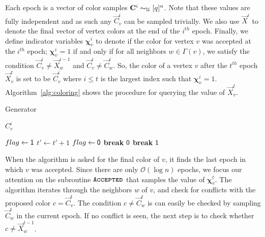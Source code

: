 Each epoch is a vector of color samples $\vec C^{i} \thicksim_{\mathcal U} [q]^n$.
Note that these values are fully independent and as such any $\vec C^i_v$ can be sampled trivially.
We also use $\vec X^i$ to denote the final vector of vertex colors at the end of the $i^{th}$ epoch.
Finally, we define indicator variables $\bm \chi^i_v$ to denote if the color for vertex $v$ was accepted at the $i^{th}$ epoch;
$\bm \chi^i_v = 1$ if and only if for all neighbors $w\in \Gamma(v)$,
we satisfy the condition $\vec  C^i_v\not= \vec X^{i-1}_w$ and $\vec C^i_v\not= \vec C^i_w$.
So, the color of a vertex $v$ after the $t^{th}$ epoch $\vec X^t_v$ is set to be $\vec C^i_v$
where $i\le t$ is the largest index such that $\bm \chi^i_v=1$.
Algorithm~\ref{alg:coloring} shows the procedure for querying the value of $\vec X^t_v$.

\begin{algorithm}[H]
\caption{Generator}
\begin{algorithmic}[1]

            \State \Return $C^i_v$
        \EndIf
    \EndFor
\EndProcedure

                    \State $flag\gets \ONE$
                        \State $t'\gets t' + 1$
                            \State $flag\gets \ZERO$
                            \State \textbf{break}
                        \EndIf
                    \EndWhile
                        \State \Return $\ZERO$
                    \EndIf
                    \State \textbf{break}
               \EndIf
           \EndIf
        \EndFor
    \EndFor
    \State \Return $\ONE$
\EndProcedure

\end{algorithmic}
\label{alg:coloring}
\end{algorithm}

When the algorithm is asked for the final color of $v$, it finds the last epoch in which $v$ was accepted.
Since there are only $\mathcal O(\log n)$ epochs, we focus our attention on the subroutine $\func{Accepted}$ that samples the value of $\bm\chi^t_v$.
The algorithm iterates through the neighbors $w$ of $v$, and check for conflicts with the proposed color $c=\vec C^t_v$.
The condition $c\not= \vec C^t_w$ is can easily be checked by sampling $\vec C^t_w$ in the current epoch.
If no conflict is seen, the next step is to check whether $c\not= \vec X^{t-1}_w$.

